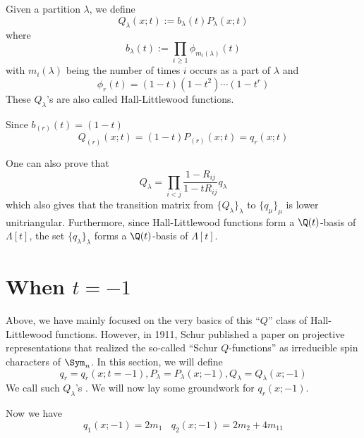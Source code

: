 \documentclass[11pt,leqno,oneside]{amsart}
\numberwithin{thm}{section}
\newcommand{\sym}{\Lambda}
\begin{document}
\begin{defn}\label{def-Q}
  Given a partition \(\lambda\), we define \[
    Q_\lambda(x;t) := b_\lambda(t) P_\lambda(x;t)
  \]
  where \[
    b_\lambda(t) := \prod_{i \geq 1} \phi_{m_i(\lambda)}(t)
  \]
  with \(m_i(\lambda)\) being the number of times \(i\) occurs as a
  part of \(\lambda\) and \[
    \phi_r(t) = (1-t)(1-t^2) \cdots (1-t^r)
  \]
  These \(Q_\lambda\)'s are also called Hall-Littlewood functions.
\end{defn}
\begin{prop}
  Since \(b_{(r)}(t) = (1-t)\)
  \[
    Q_{(r)}(x;t) = (1-t)P_{(r)}(x;t) = q_r(x;t)
  \]
\end{prop}
One can also prove that \[
  Q_\lambda = \prod_{i < j} \frac{1-R_{ij}}{1-t R_{ij}} q_\lambda
\]
which also gives that the transition matrix from
\(\{Q_\lambda\}_{\lambda}\)  to \(\{q_\mu\}_\mu\) is lower
unitriangular. Furthermore, since Hall-Littlewood functions form a
\(\Q(t)\)-basis of \(\sym[t]\), the set \(\{q_\lambda\}_\lambda\)
forms a \(\Q(t)\)-basis of \(\sym[t]\).
\section{When \(t=-1\)}
Above, we have mainly focused on the very basics of this ``\(Q\)''
class of Hall-Littlewood functions. However, in
1911, Schur published a paper on projective representations that
realized the so-called ``Schur \(Q\)-functions'' as irreducible spin
characters of \(\Sym_n\). In this section, we will define \[
  q_r = q_r(x;t=-1), P_\lambda = P_\lambda(x;-1), Q_\lambda =
  Q_\lambda(x;-1) 
\]
We call such \(Q_\lambda\)'s . We will now
lay some groundwork for \(q_r(x;-1)\). 
\begin{example}
  Now we have \[
    q_1(x;-1) = 2 m_1 \ \ \ \ q_2(x;-1) = 2 m_2 + 4 m_{11}
  \]
\end{example}
\end{document}
